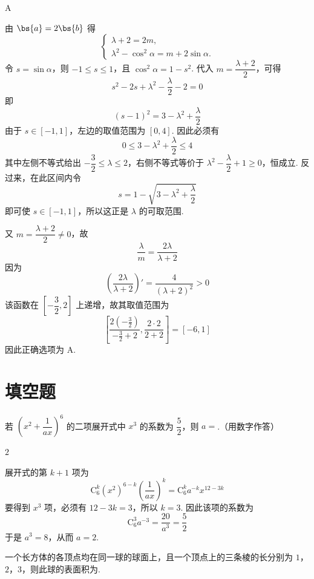 \begin{answer}
A
\end{answer}

\begin{solution}
由 \(\bs{a}=2\bs{b}\) 得
\[
\begin{cases}
\lambda+2=2m,\\
\lambda^2-\cos^2\alpha=m+2\sin\alpha.
\end{cases}
\]
令 \(s=\sin\alpha\)，则 \(-1\leqslant s\leqslant1\)，且 \(\cos^2\alpha=1-s^2\). 代入 \(m=\dfrac{\lambda+2}{2}\)，可得
\[
s^2-2s+\lambda^2-\frac{\lambda}{2}-2=0
\]
即
\[
(s-1)^2=3-\lambda^2+\frac{\lambda}{2}
\]
由于 \(s\in[-1,1]\)，左边的取值范围为 \([0,4]\). 因此必须有
\[
0\leqslant3-\lambda^2+\frac{\lambda}{2}\leqslant4
\]
其中左侧不等式给出 \(-\dfrac32\leqslant\lambda\leqslant2\)，右侧不等式等价于 \(\lambda^2-\dfrac\lambda2+1\geqslant0\)，恒成立. 反过来，在此区间内令
\[
s=1-\sqrt{3-\lambda^2+\frac{\lambda}{2}}
\]
即可使 \(s\in[-1,1]\)，所以这正是 \(\lambda\) 的可取范围.

又 \(m=\dfrac{\lambda+2}{2}\ne0\)，故
\[
\frac{\lambda}{m}=\frac{2\lambda}{\lambda+2}
\]
因为
\[
\left(\frac{2\lambda}{\lambda+2}\right)'=\frac{4}{(\lambda+2)^2}>0
\]
该函数在 \(\left[-\dfrac32,2\right]\) 上递增，故其取值范围为
\[
\left[\frac{2(-\frac{3}{2})}{-\frac{3}{2}+2},\frac{2\cdot2}{2+2}\right]=[-6,1]
\]
因此正确选项为 A.
\end{solution}

\section{填空题}

\begin{problem}
若 \(\left(x^{2} + \dfrac{1}{ax}\right)^{6}\) 的二项展开式中 \(x^{3}\) 的系数为 \(\dfrac{5}{2}\)，则 \(a =\)\fillinblank{}.（用数字作答）
\end{problem}

\begin{answer}
\(2\)
\end{answer}

\begin{solution}
展开式的第 \(k+1\) 项为
\[
\mathrm C_6^k(x^2)^{6-k}\left(\frac{1}{ax}\right)^k
=\mathrm C_6^k a^{-k}x^{12-3k}
\]
要得到 \(x^3\) 项，必须有 \(12-3k=3\)，所以 \(k=3\). 因此该项的系数为
\[
\mathrm C_6^3a^{-3}=\frac{20}{a^3}=\frac52
\]
于是 \(a^3=8\)，从而 \(a=2\).
\end{solution}

\begin{problem}
一个长方体的各顶点均在同一球的球面上，且一个顶点上的三条棱的长分别为 \(1\)，\(2\)，\(3\)，则此球的表面积为\fillinblank{}.
\end{problem}

